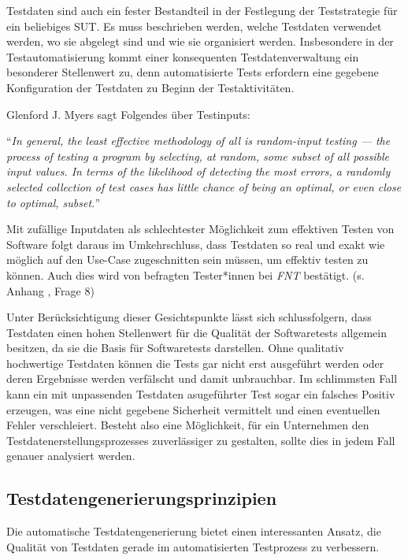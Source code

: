 Testdaten sind auch ein fester Bestandteil in der Festlegung der Teststrategie für ein beliebiges \ac{SUT}. Es muss beschrieben werden, welche Testdaten verwendet werden, wo sie abgelegt sind und wie sie organisiert werden. \cite[S. 119]{witte:2019} Insbesondere in der Testautomatisierung kommt einer konsequenten Testdatenverwaltung ein besonderer Stellenwert zu, denn automatisierte Tests erfordern eine gegebene Konfiguration der Testdaten zu Beginn der Testaktivitäten. \cite[S. 236]{witte:2019}

Glenford J. Myers sagt Folgendes über Testinputs:

\enquote{\textit{In general, the least effective methodology of all is random-input
testing — the process of testing a program by selecting, at random, some
subset of all possible input values. In terms of the likelihood of detecting
the most errors, a randomly selected collection of test cases has little
chance of being an optimal, or even close to optimal, subset.}} \cite[S. 41]{myers:2011}

Mit zufällige Inputdaten als schlechtester Möglichkeit zum effektiven Testen von Software folgt daraus im Umkehrschluss, dass Testdaten so real und exakt wie möglich auf den Use-Case zugeschnitten sein müssen, um effektiv testen zu können. Auch dies wird von befragten Tester*innen bei \textit{FNT} bestätigt. (s. Anhang , Frage 8)

Unter Berücksichtigung dieser Gesichtspunkte lässt sich schlussfolgern, dass Testdaten einen hohen Stellenwert für die Qualität der Softwaretests allgemein besitzen, da sie die Basis für Softwaretests darstellen. Ohne qualitativ hochwertige Testdaten können die Tests gar nicht erst ausgeführt werden oder deren Ergebnisse werden verfälscht und damit unbrauchbar. Im schlimmsten Fall kann ein mit unpassenden Testdaten asugeführter Test sogar ein falsches Positiv erzeugen, was eine nicht gegebene Sicherheit vermittelt und einen eventuellen Fehler verschleiert. Besteht also eine Möglichkeit, für ein Unternehmen den Testdatenerstellungsprozesses zuverlässiger zu gestalten, sollte dies in jedem Fall genauer analysiert werden.

\subsection{Testdatengenerierungsprinzipien}\label{subsec:grundlagenDatengenerierung}
Die automatische Testdatengenerierung bietet einen interessanten Ansatz, die Qualität von Testdaten gerade im automatisierten Testprozess zu verbessern. 


